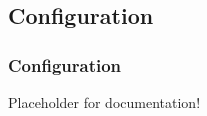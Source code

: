 \subsection{Configuration} \label{model:Configuration}
\subsubsection{Configuration}
  \label{type:Configuration}

\FloatBarrier

Placeholder for documentation!

\FloatBarrier
